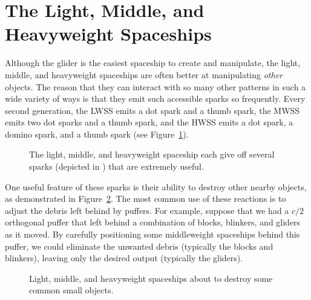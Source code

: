 \section{The Light, Middle, and Heavyweight Spaceships}\label{sec:lwss_mwss_hwss}

Although the glider is the easiest spaceship to create and manipulate, the light, middle, and heavyweight spaceships are often better at manipulating \emph{other} objects. The reason that they can interact with so many other patterns in such a wide variety of ways is that they emit such accessible sparks so frequently. Every second generation, the LWSS emits a dot spark and a thumb spark, the MWSS emits two dot sparks and a thumb spark, and the HWSS emits a dot spark, a domino spark, and a thumb spark (see Figure~\ref{fig:lwss_mwss_hwssb}).

\begin{figure}[!htb]
	\centering {}
	\caption{The light, middle, and heavyweight spaceship each give off several sparks (depicted in ) that are extremely useful.}\label{fig:lwss_mwss_hwssb}
\end{figure}

One useful feature of these sparks is their ability to destroy other nearby objects, as demonstrated in Figure~\ref{fig:orthogonal_destroy}. The most common use of these reactions is to adjust the debris left behind by puffers. For example, suppose that we had a $c/2$ orthogonal puffer that left behind a combination of blocks, blinkers, and gliders as it moved. By carefully positioning some middleweight spaceships behind this puffer, we could eliminate the unwanted debris (typically the blocks and blinkers), leaving only the desired output (typically the gliders).

\begin{figure}[!htb]
	\centering {}
	\caption{Light, middle, and heavyweight spaceships about to destroy some common small objects.}\label{fig:orthogonal_destroy}
\end{figure}

